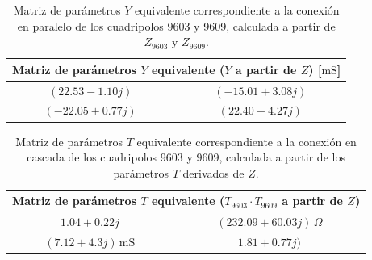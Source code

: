 \begin{table}[H]
\centering
\begin{tabular}{|c|c|}
\hline
\multicolumn{2}{|c|}{\textbf{Matriz de parámetros $Y$ equivalente ($Y$ a partir de $Z$) [$\mathrm{mS}$]}} \\ \hline
$(22.53 - 1.10j)\,$ & $(-15.01 + 3.08j)\,$ \\ \hline
$(-22.05 + 0.77j)\,$ & $(22.40 + 4.27j)\,$ \\ \hline
\end{tabular}
\caption{Matriz de parámetros $Y$ equivalente correspondiente a la conexión en paralelo de los cuadripolos 9603 y 9609, calculada a partir de $Z_{9603}$ y $Z_{9609}$.}
\label{tab:matriz_Y_paralelo_desdeZ}
\end{table}

\begin{table}[H]
\centering
\begin{tabular}{|c|c|}
\hline
\multicolumn{2}{|c|}{\textbf{Matriz de parámetros $T$ equivalente ($T_{9603} \cdot T_{9609}$ a partir de $Z$)}} \\ \hline
$1.04 + 0.22j$ & $(232.09 + 60.03j)\,\Omega$ \\ \hline
$(7.12 + 4.3 j)\,\mathrm{mS}$ & $1.81 + 0.77

j)$ \\ \hline
\end{tabular}
\caption{Matriz de parámetros $T$ equivalente correspondiente a la conexión en cascada de los cuadripolos 9603 y 9609, calculada a partir de los parámetros $T$ derivados de $Z$.}
\label{tab:matriz_T_cascada_desdeZ}
\end{table}

	
	
	
	
	
